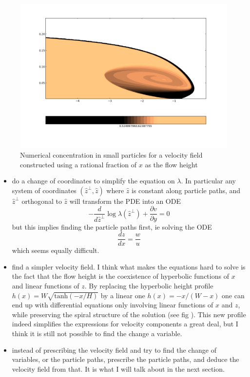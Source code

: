 \documentclass[11pt]{article}
\newcommand{\p}[2]{\ensuremath{\frac{\partial {#1}}{\partial {#2}}}}
\newcommand{\tot}[2]{\ensuremath{\frac{d {#1}}{d {#2}}}}
\newcommand{\lam}{\ensuremath{\lambda}}
\begin{document}
\begin{figure}[htp]
\centering
\includegraphics[scale=0.4]{rational_profile_spiral.png}
\caption{Numerical concentration in small particles for a velocity field constructed using a rational fraction of $x$ as the flow height}
\label{fig:2}
\end{figure}

\begin{itemize}
\item do a change of coordinates to simplify the equation on \lam. In particular any system of coordinates $(\hat z^\perp, \hat z)$ where $\hat z$ is constant along particle paths, and $\hat z^\perp$ orthogonal to $\hat z$ will transform the PDE into an ODE
\begin{equation}
	-\tot{}{\hat z^\perp} \log \lam(\hat z^\perp) + \p{v}{y} = 0
\end{equation}
but this implies finding the particle paths first, ie solving the ODE
\begin{equation}
	\tot{z}{x} = \frac{w}{u}
\end{equation}
which seems equally difficult.
\item find a simpler velocity field. I think what makes the equations hard to solve is the fact that the flow height is the coexistence of hyperbolic functions of $x$ and linear functions of $z$.
By replacing the hyperbolic height profile $h(x) = W \sqrt{ \text{tanh}(-x/H)}$ by a linear one $h(x) = - x/ (W - x) $ one can end up with differential equations only involving linear functions of $x$ and $z$, while preserving the spiral structure of the solution (see fig \cite{fig:2}).
This new profile indeed simplifies the expressions for velocity components a great deal, but I think it is still not possible to find the change a variable.
\item instead of prescribing the velocity field and try to find the change of variables, or the particle paths, prescribe the particle paths, and deduce the velocity field from that. It is what I will talk about in the next section.
\end{itemize} 
\end{document}
